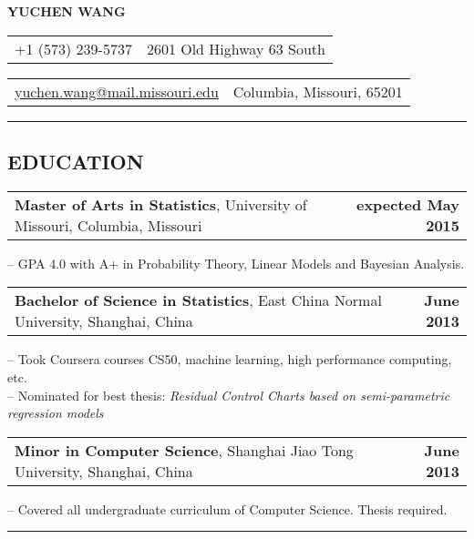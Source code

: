\documentclass[11pt]{article}
\makeatletter
\newcommand{\headerrow}[2]
{\begin{tabular*}{\linewidth}{l@{\extracolsep{\fill}}r}
	#1 &
	#2 \\
\end{tabular*}}
\makeatother
\begin{document}
\begin{center}
	\huge\textbf{YUCHEN WANG}
\end{center}

\noindent\headerrow{+1 (573) 239-5737}{2601 Old Highway 63 South}
\headerrow
{\href{mailto:yuchen.wang@mail.missouri.edu}{yuchen.wang@mail.missouri.edu}}
{Columbia, Missouri, 65201}



\vspace{0.2em}
\hrule
\vspace{-1em}


\subsection*{\centering EDUCATION}
\vspace{-.6em}


\headerrow
	{\textbf{Master of Arts in Statistics}, University of Missouri, Columbia, Missouri}
	{\textbf{expected May 2015}}
	\indent – GPA 4.0 with A+ in Probability Theory, Linear Models and Bayesian Analysis.\\
\headerrow
	{\textbf{Bachelor of Science in Statistics}, East China Normal University, Shanghai, China}
	{\textbf{June 2013}}
	\indent -- Took Coursera courses CS50, machine learning, high performance computing, etc.\\
	\indent -- Nominated for best thesis: \textit{Residual Control Charts based on semi-parametric regression models}\\
\headerrow
	{\textbf{Minor in Computer Science}, Shanghai Jiao Tong University, Shanghai, China}
	{\textbf{June 2013}}
	\indent -- Covered all undergraduate curriculum of Computer Science. Thesis required.

\vspace{0.2em}
\hrule
\vspace{-1em}
\end{document}
